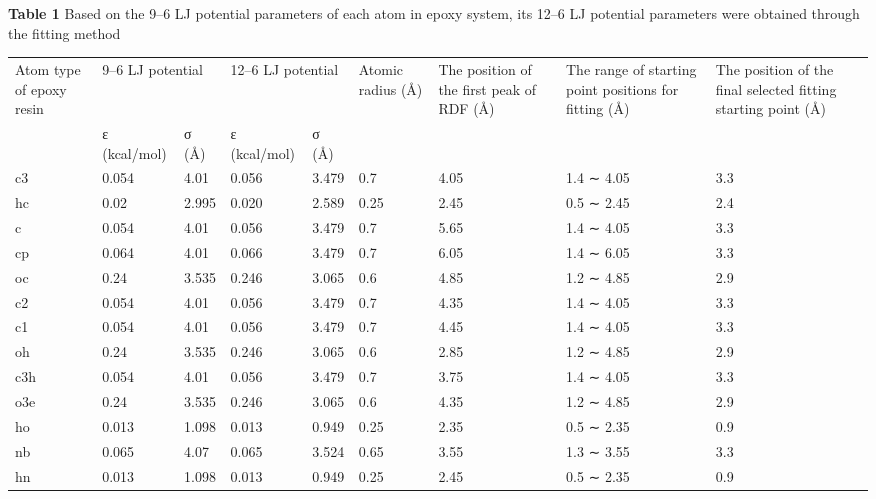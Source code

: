 \documentclass{article}
\begin{document}
\noindent\textbf{Table 1} Based on the 9–6 LJ potential parameters of each atom in epoxy system, its 12–6 LJ potential parameters were obtained through the fitting method
\begin{center}\footnotesize
\begin{tabular}{p{1.3cm}llllp{1.0cm}p{1.8cm}p{1.9cm}p{2.0cm}}
\toprule
Atom type of epoxy resin & \multicolumn{2}{l}{9–6 LJ potential} & \multicolumn{2}{l}{12–6 LJ potential} & Atomic radius (Å) & The position of the first peak of RDF (Å) & The range of starting point positions for fitting (Å) & The position of the final selected fitting starting point (Å)\\
 & ε (kcal/mol) & σ (Å) & ε (kcal/mol) & σ (Å) & & & & \\
\midrule
c3 & 0.054 & 4.01 & 0.056 & 3.479 & 0.7 & 4.05 & 1.4 ∼ 4.05 & 3.3\\
hc & 0.02 & 2.995 & 0.020 & 2.589 & 0.25 & 2.45 & 0.5 ∼ 2.45 & 2.4\\
c & 0.054 & 4.01 & 0.056 & 3.479 & 0.7 & 5.65 & 1.4 ∼ 4.05 & 3.3\\
cp & 0.064 & 4.01 & 0.066 & 3.479 & 0.7 & 6.05 & 1.4 ∼ 6.05 & 3.3\\
oc & 0.24 & 3.535 & 0.246 & 3.065 & 0.6 & 4.85 & 1.2 ∼ 4.85 & 2.9\\
c2 & 0.054 & 4.01 & 0.056 & 3.479 & 0.7 & 4.35 & 1.4 ∼ 4.05 & 3.3\\
c1 & 0.054 & 4.01 & 0.056 & 3.479 & 0.7 & 4.45 & 1.4 ∼ 4.05 & 3.3\\
oh & 0.24 & 3.535 & 0.246 & 3.065 & 0.6 & 2.85 & 1.2 ∼ 4.85 & 2.9\\
c3h & 0.054 & 4.01 & 0.056 & 3.479 & 0.7 & 3.75 & 1.4 ∼ 4.05 & 3.3\\
o3e & 0.24 & 3.535 & 0.246 & 3.065 & 0.6 & 4.35 & 1.2 ∼ 4.85 & 2.9\\
ho & 0.013 & 1.098 & 0.013 & 0.949 & 0.25 & 2.35 & 0.5 ∼ 2.35 & 0.9\\
nb & 0.065 & 4.07 & 0.065 & 3.524 & 0.65 & 3.55 & 1.3 ∼ 3.55 & 3.3\\
hn & 0.013 & 1.098 & 0.013 & 0.949 & 0.25 & 2.45 & 0.5 ∼ 2.35 & 0.9\\
\bottomrule
\end{tabular}
\end{center}
\end{document}
